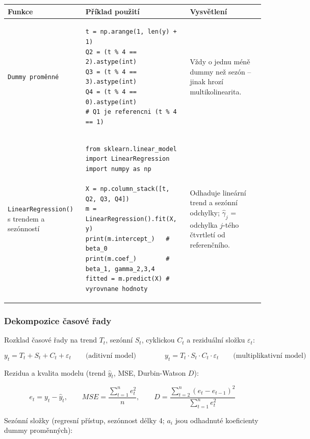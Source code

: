 \documentclass[a4paper, 11pt]{article}
\newenvironment{funkcedict}
{%
  \begingroup
  \renewcommand{\arraystretch}{1.4}%
  \lstset{basicstyle=\ttfamily\small, columns=fullflexible}%
  \setlength{\tabcolsep}{4pt}%
  \begin{tabular}{p{0.19\textwidth} p{0.38\textwidth} p{0.30\textwidth}}
  \textbf{Funkce} & \textbf{Příklad použití} & \textbf{Vysvětlení} \\
  \midrule
}
{%
  \end{tabular}%
  \endgroup
}
\begin{document}
\begin{funkcedict}

	\texttt{Dummy proměnné} &
	\begin{lstlisting}
t = np.arange(1, len(y) + 1)
Q2 = (t % 4 == 2).astype(int)
Q3 = (t % 4 == 3).astype(int)
Q4 = (t % 4 == 0).astype(int)
# Q1 je referencni (t % 4 == 1)
	\end{lstlisting}
	&
	Vždy o jednu méně dummy než sezón -- jinak hrozí multikolinearita. \\

	\texttt{LinearRegression()} s trendem a sezónností &
	\begin{lstlisting}
from sklearn.linear_model import LinearRegression
import numpy as np

X = np.column_stack([t, Q2, Q3, Q4])
m = LinearRegression().fit(X, y)
print(m.intercept_)   # beta_0
print(m.coef_)        # beta_1, gamma_2,3,4
fitted = m.predict(X) # vyrovnane hodnoty
	\end{lstlisting}
	&
	Odhaduje lineární trend a sezónní odchylky; $\hat{\gamma}_j$ = odchylka $j$-tého čtvrtletí od referenčního. \\

\end{funkcedict}

\subsubsection{Dekompozice časové řady}

Rozklad časové řady na trend $T_t$, sezónní $S_t$, cyklickou $C_t$ a reziduální složku $\varepsilon_t$:

\begin{equation*}
	y_t = T_t + S_t + C_t + \varepsilon_t \qquad \text{(aditivní model)}
	\qquad\qquad
	y_t = T_t \cdot S_t \cdot C_t \cdot \varepsilon_t \qquad \text{(multiplikativní model)}
\end{equation*}

Rezidua a kvalita modelu (trend $\hat{y}_t$, MSE, Durbin-Watson $D$):

\begin{equation*}
	e_t = y_t - \hat{y}_t, \qquad
	MSE = \frac{\displaystyle\sum_{t=1}^{n} e_t^2}{n}, \qquad
	D = \frac{\displaystyle\sum_{t=2}^{n}(e_t - e_{t-1})^2}{\displaystyle\sum_{t=1}^{n} e_t^2}
\end{equation*}

Sezónní složky (regresní přístup, sezónnost délky 4; $a_i$ jsou odhadnuté koeficienty dummy proměnných):
\end{document}
